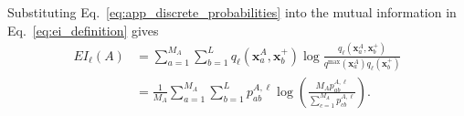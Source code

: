Substituting Eq.~\eqref{eq:app_discrete_probabilities} into the mutual
information in Eq.~\eqref{eq:ei_definition} gives
\begin{align}
    EI_{\ell}(A)
    &=
    \sum_{a=1}^{M_A}
    \sum_{b=1}^{L}
    q_{\ell}
    \left(
        \boldsymbol{x}_a^{A},
        \boldsymbol{x}_b^{+}
    \right)
    \log
    \frac{
        q_{\ell}
        \left(
            \boldsymbol{x}_a^{A},
            \boldsymbol{x}_b^{+}
        \right)
    }{
        q^{\max}(\boldsymbol{x}_a^{A})
        q_{\ell}(\boldsymbol{x}_b^{+})
    }
    \nonumber\\
    &=
    \frac{1}{M_A}
    \sum_{a=1}^{M_A}
    \sum_{b=1}^{L}
    p_{ab}^{A,\ell}
    \log
    \left(
        \frac{
            M_Ap_{ab}^{A,\ell}
        }{
            \sum_{c=1}^{M_A}p_{cb}^{A,\ell}
        }
    \right).
    \label{eq:app_discrete_ei}
\end{align}


